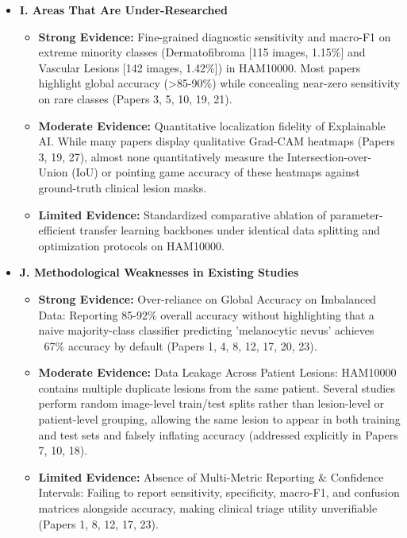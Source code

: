 \documentclass[11pt,a4paper]{article}
\begin{document}
\begin{itemize}
\begin{itemize}
  \item \textbf{Limited Evidence:} Generative Oversampling vs. Metric Loss Adjustment: Gong et al. (Paper 15) and Zafar et al. (Paper 39) advocate using GANs (StyleGAN, SLGAN) to synthesize minority samples to balance datasets. In contrast, Öztürk \& Çukur (Paper 10) and Wang et al. (Paper 33) demonstrate that generative oversampling often introduces hallucinated high-frequency artifacts, arguing instead for metric-space loss adjustments (COMF-TL, part cross-entropy) that operate directly on real samples.
\end{itemize}
\item \textbf{I. Areas That Are Under-Researched}
\begin{itemize}
  \item \textbf{Strong Evidence:} Fine-grained diagnostic sensitivity and macro-F1 on extreme minority classes (Dermatofibroma [115 images, 1.15\%] and Vascular Lesions [142 images, 1.42\%]) in HAM10000. Most papers highlight global accuracy (>85-90\%) while concealing near-zero sensitivity on rare classes (Papers 3, 5, 10, 19, 21).
  \item \textbf{Moderate Evidence:} Quantitative localization fidelity of Explainable AI. While many papers display qualitative Grad-CAM heatmaps (Papers 3, 19, 27), almost none quantitatively measure the Intersection-over-Union (IoU) or pointing game accuracy of these heatmaps against ground-truth clinical lesion masks.
  \item \textbf{Limited Evidence:} Standardized comparative ablation of parameter-efficient transfer learning backbones under identical data splitting and optimization protocols on HAM10000.
\end{itemize}
\item \textbf{J. Methodological Weaknesses in Existing Studies}
\begin{itemize}
  \item \textbf{Strong Evidence:} Over-reliance on Global Accuracy on Imbalanced Data: Reporting 85-92\% overall accuracy without highlighting that a naive majority-class classifier predicting 'melanocytic nevus' achieves ~67\% accuracy by default (Papers 1, 4, 8, 12, 17, 20, 23).
  \item \textbf{Moderate Evidence:} Data Leakage Across Patient Lesions: HAM10000 contains multiple duplicate lesions from the same patient. Several studies perform random image-level train/test splits rather than lesion-level or patient-level grouping, allowing the same lesion to appear in both training and test sets and falsely inflating accuracy (addressed explicitly in Papers 7, 10, 18).
  \item \textbf{Limited Evidence:} Absence of Multi-Metric Reporting \& Confidence Intervals: Failing to report sensitivity, specificity, macro-F1, and confusion matrices alongside accuracy, making clinical triage utility unverifiable (Papers 1, 8, 12, 17, 23).
\end{itemize}

\end{itemize}
\end{document}
